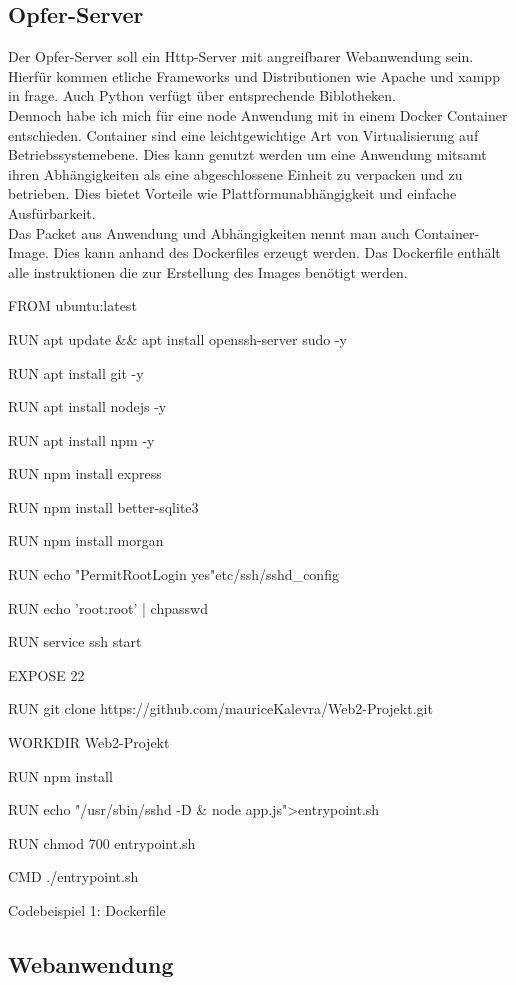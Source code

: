\documentclass[12pt]{article}
\begin{document}
\subsection{Opfer-Server}
Der Opfer-Server soll ein Http-Server mit angreifbarer Webanwendung sein. Hierfür kommen etliche Frameworks und Distributionen wie Apache und xampp in frage. Auch Python verfügt über entsprechende Biblotheken.\\
Dennoch habe ich mich für eine node Anwendung mit in einem Docker Container entschieden.
Container sind eine leichtgewichtige Art von Virtualisierung auf Betriebssystemebene. Dies kann genutzt werden um eine Anwendung mitsamt ihren Abhängigkeiten als eine abgeschlossene Einheit zu verpacken und zu betrieben. Dies bietet Vorteile wie Plattformunabhängigkeit und einfache Ausfürbarkeit.\\
Das Packet aus Anwendung und Abhängigkeiten
nennt man auch Container-Image. Dies kann anhand des Dockerfiles erzeugt werden. Das Dockerfile enthält alle instruktionen die zur Erstellung des Images benötigt werden.  \\
\begin{shaded}
\begin{internallinenumbers}
FROM ubuntu:latest

RUN apt update \&\& apt install  openssh-server sudo -y

RUN apt install git -y

RUN apt install nodejs -y

RUN apt install npm -y

RUN npm install express

RUN npm install better-sqlite3

RUN npm install morgan

RUN echo "PermitRootLogin yes"\>etc/ssh/sshd\_config

RUN  echo 'root:root' | chpasswd

RUN service ssh start

EXPOSE 22

RUN git clone https://github.com/mauriceKalevra/Web2-Projekt.git

WORKDIR Web2-Projekt

RUN npm install

RUN echo  "/usr/sbin/sshd -D \& node app.js">entrypoint.sh

RUN chmod 700 entrypoint.sh

CMD ./entrypoint.sh
\end{internallinenumbers}
\end{shaded}
\begin{center}
 Codebeispiel 1: Dockerfile
\end{center}



\subsection{Webanwendung}
\end{document}
